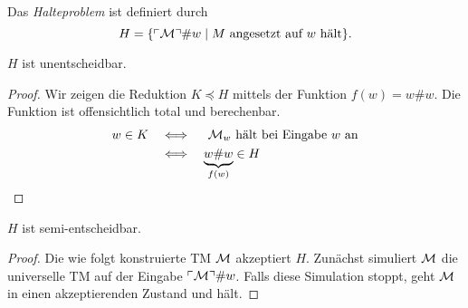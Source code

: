 \begin{Def}[name={[Halteproblem]}]
	Das \emph{Halteproblem} ist definiert durch
	\[H = \{\ulcorner \mathcal{M} \urcorner\# w \mid M \text{ angesetzt auf } w \text{ hält}\}. \qedhere\]
\end{Def}
\begin{Satz}[name={[$H$ ist unentscheidbar]}]\label{satz:H ist unentscheidbar}
	$H$ ist unentscheidbar.
\end{Satz}
\begin{proof}
  Wir zeigen die Reduktion $K \preceq H$ mittels der Funktion $f(w) = w\#w$.
  Die Funktion ist offensichtlich total und berechenbar.
  \begin{align*}
   w \in K & \quad\Longleftrightarrow\quad \text{ $\mathcal{M}_w$ hält bei Eingabe $w$ an}\\
   & \quad\Longleftrightarrow\quad \underbrace{w\#w}_{f(w)} \in H \qedhere
  \end{align*}
\end{proof}
\begin{Satz}[name={[$H$ ist semi-entscheidbar]}]\label{satz:H-semi-entscheidbar}
	$H$ ist semi-entscheidbar.
\end{Satz}
\begin{proof}
  Die wie folgt konstruierte \ac{TM} $\mathcal{M}$ akzeptiert $H$.
  Zunächst simuliert $\mathcal{M}$ die universelle \ac{TM} auf der Eingabe $\ulcorner \mathcal{M} \urcorner\#w$.
  Falls diese Simulation stoppt, geht $\mathcal{M}$ in einen akzeptierenden Zustand und hält.
\end{proof}


